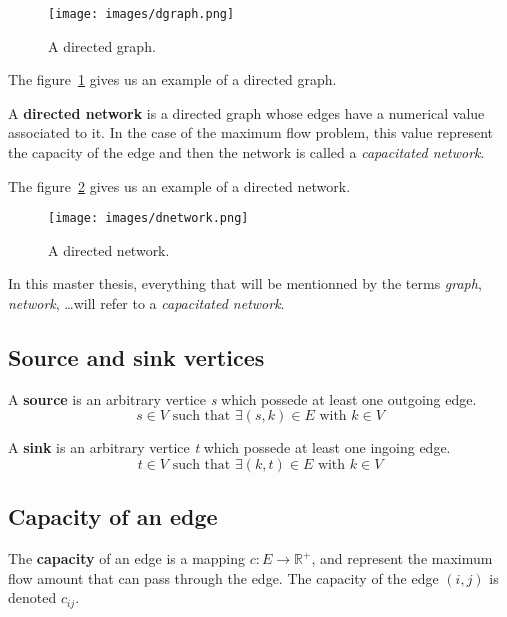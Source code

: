 \begin{figure}
\centering
\texttt{[image: images/dgraph.png]}
\caption{A directed graph.}
\label{img:dgraph}
\end{figure}

The figure~\ref{img:dgraph} gives us an example of a directed graph.

\begin{definition}
\label{dnetwork}
A \textbf{directed network} is a directed graph whose edges have a numerical value associated to it. In the case of the maximum flow problem, this value represent the capacity of the edge and then the network is called a \textit{capacitated network}.
\end{definition}

The figure~\ref{img:dnetwork} gives us an example of a directed network. \\

\begin{figure}
\centering
\texttt{[image: images/dnetwork.png]}
\caption{A directed network.}
\label{img:dnetwork}
\end{figure}



In this master thesis, everything that will be mentionned by the terms \textit{graph}, \textit{network}, \dots will refer to a \textit{capacitated network}.


\subsection{Source and sink vertices}
\begin{definition}
\label{source}
A \textbf{source} is an arbitrary vertice \textit{s} which possede at least one outgoing edge.
$$s \in V \text{ such that } \exists (s, k) \in E \text{ with } k \in V$$
\end{definition}

\begin{definition}
\label{sink}
A \textbf{sink} is an arbitrary vertice \textit{t} which possede at least one ingoing edge. 
$$t \in V \text{ such that } \exists (k, t) \in E \text{ with } k \in V$$
\end{definition}

\subsection{Capacity of an edge}
\begin{definition}
\label{cedge}
The \textbf{capacity} of an edge is a mapping $c: E \to \mathbb{R}^{+}$, and represent the maximum flow amount that can pass through the edge. The capacity of the edge $(i, j)$ is denoted $c_{ij}$.
\end{definition}


